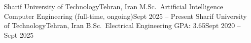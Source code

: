 \resumeSubheading
  {Sharif University of Technology}{Tehran, Iran}
  {M.Sc.\ Artificial Intelligence \quad Computer Engineering (full-time, ongoing)}{Sept 2025 -- Present}
\resumeSubheading
  {Sharif University of Technology}{Tehran, Iran}
  {B.Sc.\ Electrical Engineering \quad GPA: 3.65}{Sept 2020 -- Sept 2025}
